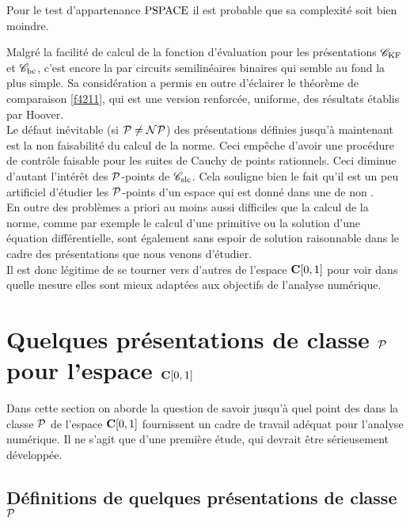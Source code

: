 \bni Pour le test d'appartenance ${\rm PSPACE} $ il est probable que sa complexité 
soit bien moindre.

\begin{fremark} \label{f444}
Malgré la facilité de calcul de la fonction d'évaluation pour les 
présentations ${{{\mathscr C}}_{\rm KF}}$  et   ${{{\mathscr C}}_{\rm bc}}$, c'est encore la \pres par circuits 
semilinéaires binaires qui semble au fond la plus simple. 
Sa considération a permis en outre d'éclairer le théorème de comparaison 
\ref{f4211}, qui est une version renforcée, uniforme, des résultats établis 
par Hoover. \\
Le défaut inévitable (si ${\cal P} \neq {\cal NP}$) des présentations définies 
jusqu'à maintenant est la non faisabilité du calcul de la norme. 
Ceci empêche d'avoir une procédure de contrôle faisable pour les suites 
de Cauchy de points rationnels. 
Ceci diminue d'autant l'intérêt des  ${\cal P}$-points de  ${{{\mathscr C}}_{\rm slc}}$. Cela souligne 
bien le fait qu'il est un peu artificiel d'étudier les  ${\cal P}$-points d'un 
espace qui est donné dans une \pres de \com non \polle.\\
En outre des problèmes a priori au moins aussi difficiles que la calcul de la 
norme, comme par exemple le calcul d'une primitive ou la solution d'une 
équation différentielle, sont également sans espoir de solution 
raisonnable dans le cadre des présentations que nous venons d'étudier.\\ 
Il est donc légitime de se tourner vers d'autres \rps  de l'espace  ${{\bf C}[0,1]}$  
pour voir dans quelle mesure elles sont mieux adaptées aux objectifs de 
l'analyse numérique.
\end{fremark}




\section{Quelques présentations de classe  \texorpdfstring{${\cal P}$}{P} 
pour l'espace   \texorpdfstring{${{\bf C}[0,1]}$}{C[0,1]}}\label{fsec5}
Dans cette section on aborde la question de savoir jusqu'à quel point des \rps  
dans la classe  ${\cal P}$  de l'espace  ${{\bf C}[0,1]}$  fournissent un cadre de travail 
adéquat pour l'analyse numérique. Il ne s'agit que d'une première étude, 
qui devrait être sérieusement développée.

\subsection {Définitions de quelques présentations de classe  
${\cal P}$}\label{fsubsec51}

